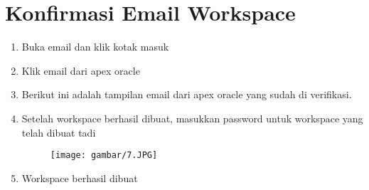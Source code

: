 \section{Konfirmasi Email Workspace}

\begin{enumerate}
    \item Buka email dan klik kotak masuk
    \item Klik email dari apex oracle
    \item Berikut ini adalah tampilan email dari apex oracle yang sudah di verifikasi.
    
    \item Setelah workspace berhasil dibuat, masukkan password untuk workspace yang telah dibuat tadi

\begin{figure}[!htbp]
    \centering
    \texttt{[image: gambar/7.JPG]}
    \label{penanda}
\end{figure}

    \item Workspace berhasil dibuat
 
\end{enumerate}
\vspace{6cm}

